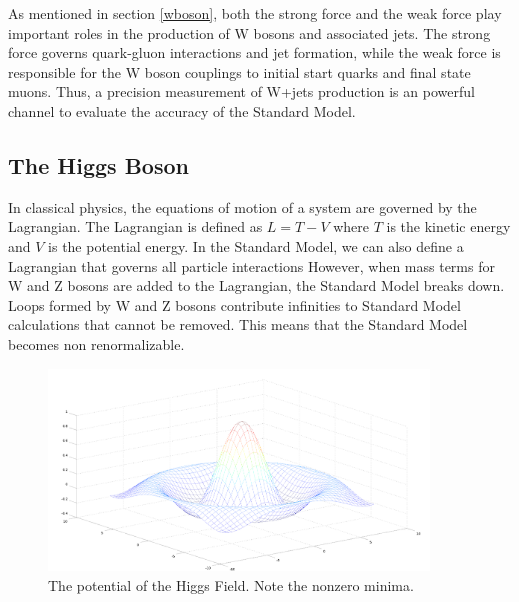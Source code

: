 \documentclass[oneside, letterpaper, oldfontcommands]{memoir}
\begin{document}
\qquad As mentioned in section \ref{wboson}, both the strong force and the weak force play important roles in the production of W bosons and associated jets. The strong force governs quark-gluon interactions and jet formation, while the weak force is responsible for the W boson couplings to initial start quarks and final state muons. Thus, a precision measurement of W+jets production is an powerful channel to evaluate the accuracy of the Standard Model.



\subsection{The Higgs Boson}\label{higgstheory}
\qquad In classical physics, the equations of motion of a system are governed by the Lagrangian. The Lagrangian is defined as $L = T - V$ where $T$ is the kinetic energy and $V$ is the potential energy. In the Standard Model, we can also define a Lagrangian that governs all particle interactions\cite{Halzen:1984mc} However, when mass terms for W and Z bosons are added to the Lagrangian, the Standard Model breaks down. Loops formed by W and Z bosons contribute infinities to Standard Model calculations that cannot be removed. This means that the Standard Model becomes non renormalizable. 

\begin{figure}[here]
\includegraphics[width=0.9\textwidth]{HiggsPotential.png}
\caption{The potential of the Higgs Field. Note the nonzero minima.}
\label{fig:HiggsPotential}
\end{figure}
\end{document}
